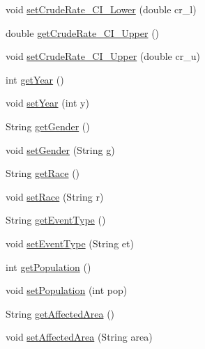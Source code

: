 \begin{DoxyCompactItemize}
void \hyperlink{classbridges_1_1data__src__dependent_1_1_cancer_incidence_a72e3960af58f32d26e32f49ada2f1555}{set\+Crude\+Rate\+\_\+\+C\+I\+\_\+\+Lower} (double cr\+\_\+l)
\item 
double \hyperlink{classbridges_1_1data__src__dependent_1_1_cancer_incidence_a4ca1ceed275ab6371f861d3a03975f15}{get\+Crude\+Rate\+\_\+\+C\+I\+\_\+\+Upper} ()
\item 
void \hyperlink{classbridges_1_1data__src__dependent_1_1_cancer_incidence_a99e25dd53093badf350b06b7e0c8b725}{set\+Crude\+Rate\+\_\+\+C\+I\+\_\+\+Upper} (double cr\+\_\+u)
\item 
int \hyperlink{classbridges_1_1data__src__dependent_1_1_cancer_incidence_aaff714019154afa796d54ed57ffc9492}{get\+Year} ()
\item 
void \hyperlink{classbridges_1_1data__src__dependent_1_1_cancer_incidence_aa5524736b76d67f1248d1a05d9f596a9}{set\+Year} (int y)
\item 
String \hyperlink{classbridges_1_1data__src__dependent_1_1_cancer_incidence_a2c3cbe65d89827c167f15314b8b088b3}{get\+Gender} ()
\item 
void \hyperlink{classbridges_1_1data__src__dependent_1_1_cancer_incidence_a217681578e13197e1d177932c73ea80f}{set\+Gender} (String g)
\item 
String \hyperlink{classbridges_1_1data__src__dependent_1_1_cancer_incidence_a18de1c14d36cd7656555c8465ea8a009}{get\+Race} ()
\item 
void \hyperlink{classbridges_1_1data__src__dependent_1_1_cancer_incidence_a8c26c4358561453f3d2ca3a463eed872}{set\+Race} (String r)
\item 
String \hyperlink{classbridges_1_1data__src__dependent_1_1_cancer_incidence_a844c6c3317bdb6b124f32b40804e1ff7}{get\+Event\+Type} ()
\item 
void \hyperlink{classbridges_1_1data__src__dependent_1_1_cancer_incidence_a39338b20223e60b79fa38b3034ca46b7}{set\+Event\+Type} (String et)
\item 
int \hyperlink{classbridges_1_1data__src__dependent_1_1_cancer_incidence_a41c2507d46589080f6bb76ab29f53665}{get\+Population} ()
\item 
void \hyperlink{classbridges_1_1data__src__dependent_1_1_cancer_incidence_a9f1caf002b6573aa699a81ed1b835af0}{set\+Population} (int pop)
\item 
String \hyperlink{classbridges_1_1data__src__dependent_1_1_cancer_incidence_ad4c0c709fa5da9c0f20b648052db5f26}{get\+Affected\+Area} ()
\item 
void \hyperlink{classbridges_1_1data__src__dependent_1_1_cancer_incidence_a9c7f2d303da9498e5e6145439c5a6fbc}{set\+Affected\+Area} (String area)

\end{DoxyCompactItemize}
